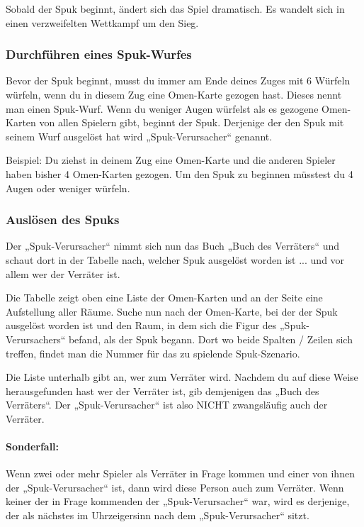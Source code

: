 Sobald der Spuk beginnt, ändert sich das Spiel dramatisch. Es wandelt sich in einen verzweifelten Wettkampf um den Sieg.

\subsubsection{Durchführen eines Spuk-Wurfes}
\label{kap:rule:makehauntroll}

Bevor der Spuk beginnt, musst du immer am Ende deines Zuges mit 6 Würfeln würfeln, wenn du in diesem Zug eine Omen-Karte gezogen hast. Dieses nennt man einen Spuk-Wurf. Wenn du weniger Augen würfelst als es gezogene Omen-Karten von allen Spielern gibt, beginnt der Spuk. Derjenige der den Spuk mit seinem Wurf ausgelöst hat wird „Spuk-Verursacher“ genannt.

Beispiel: Du ziehst in deinem Zug eine Omen-Karte und die anderen Spieler haben bisher 4 Omen-Karten gezogen. Um den Spuk zu beginnen müsstest du 4 Augen oder weniger würfeln.

\subsubsection{Auslösen des Spuks}

Der „Spuk-Verursacher“ nimmt sich nun das Buch „Buch des Verräters“ und schaut dort in der Tabelle nach, welcher Spuk ausgelöst worden ist ... und vor allem wer der Verräter ist.

Die Tabelle zeigt oben eine Liste der Omen-Karten und an der Seite eine Aufstellung aller Räume. Suche nun nach der Omen-Karte, bei der der Spuk ausgelöst worden ist und den Raum, in dem sich die Figur des „Spuk-Verursachers“ befand, als der Spuk begann. Dort wo beide Spalten / Zeilen sich treffen, findet man die Nummer für das zu spielende Spuk-Szenario.

Die Liste unterhalb gibt an, wer zum Verräter wird. Nachdem du auf diese Weise herausgefunden hast wer der Verräter ist, gib demjenigen das „Buch des Verräters“. Der „Spuk-Verursacher“ ist also NICHT zwangsläufig auch der Verräter.

\paragraph{Sonderfall:} Wenn zwei oder mehr Spieler als Verräter in Frage kommen und einer von ihnen der „Spuk-Verursacher“ ist, dann wird diese Person auch zum Verräter. Wenn keiner der in Frage kommenden der „Spuk-Verursacher“ war, wird es derjenige, der als nächstes im Uhrzeigersinn nach dem „Spuk-Verursacher“ sitzt.

